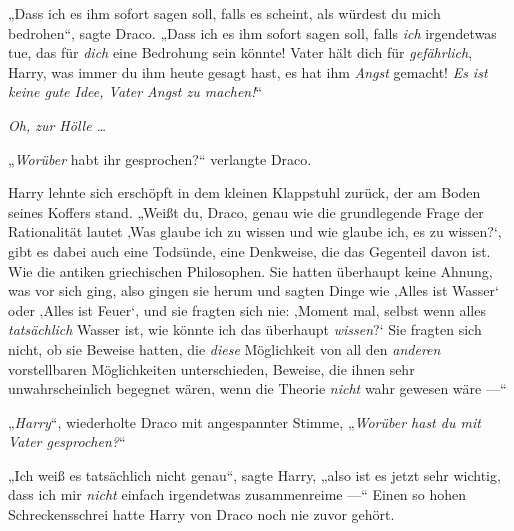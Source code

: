 „Dass ich es ihm sofort sagen soll, falls es scheint, als würdest du mich bedrohen“, sagte Draco.
„Dass ich es ihm sofort sagen soll, falls \emph{ich} irgendetwas tue, das für \emph{dich} eine Bedrohung sein könnte! Vater hält dich für \emph{gefährlich}, Harry, was immer du ihm heute gesagt hast, es hat ihm \emph{Angst} gemacht! \emph{Es ist keine gute Idee, Vater Angst zu machen!}“

\emph{Oh, zur Hölle …}

„\emph{Worüber} habt ihr gesprochen?“ verlangte Draco.

Harry lehnte sich erschöpft in dem kleinen Klappstuhl zurück, der am Boden seines Koffers stand.
„Weißt du, Draco, genau wie die grundlegende Frage der Rationalität lautet ‚Was glaube ich zu wissen und wie glaube ich, es zu wissen?‘, gibt es dabei auch eine Todsünde, eine Denkweise, die das Gegenteil davon ist. Wie die antiken griechischen Philosophen. Sie hatten überhaupt keine Ahnung, was vor sich ging, also gingen sie herum und sagten Dinge wie ‚Alles ist Wasser‘ oder ‚Alles ist Feuer‘, und sie fragten sich nie: ‚Moment mal, selbst wenn alles \emph{tatsächlich} Wasser ist, wie könnte ich das überhaupt \emph{wissen}?‘ Sie fragten sich nicht, ob sie Beweise hatten, die \emph{diese} Möglichkeit von all den \emph{anderen} vorstellbaren Möglichkeiten unterschieden, Beweise, die ihnen sehr unwahrscheinlich begegnet wären, wenn die Theorie \emph{nicht} wahr gewesen wäre —“

„\emph{Harry}“, wiederholte Draco mit angespannter Stimme,
„\emph{Worüber hast du mit Vater gesprochen?}“

„Ich weiß es tatsächlich nicht genau“, sagte Harry, „also ist es jetzt sehr wichtig, dass ich mir \emph{nicht} einfach irgendetwas zusammenreime —“
Einen so hohen Schreckensschrei hatte Harry von Draco noch nie zuvor gehört.